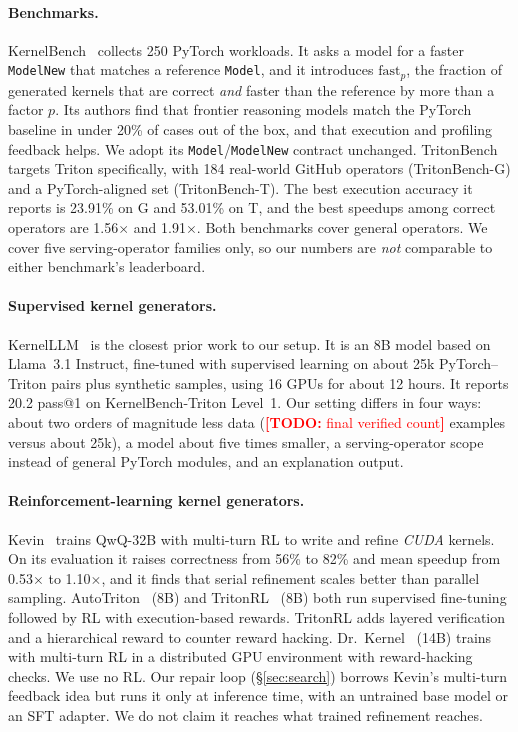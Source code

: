 \documentclass[11pt]{article}
\newcommand{\todo}[1]{\textcolor{red}{\textbf{[TODO:} #1\textbf{]}}}
\newcommand{\code}[1]{\texttt{#1}}
\begin{document}
\paragraph{Benchmarks.}
KernelBench~\cite{ouyang2025kernelbench} collects 250 PyTorch workloads. It asks a model for a
faster \code{ModelNew} that matches a reference \code{Model}, and it introduces $\mathrm{fast}_p$,
the fraction of generated kernels that are correct \emph{and} faster than the reference by more
than a factor $p$. Its authors find that frontier reasoning models match the PyTorch baseline in
under 20\% of cases out of the box, and that execution and profiling feedback helps. We adopt
its \code{Model}/\code{ModelNew} contract unchanged. TritonBench~\cite{li2025tritonbench} targets
Triton specifically, with 184 real-world GitHub operators (TritonBench-G) and a PyTorch-aligned
set (TritonBench-T). The best execution accuracy it reports is 23.91\% on G and 53.01\% on T, and
the best speedups among correct operators are 1.56$\times$ and 1.91$\times$. Both benchmarks cover
general operators. We cover five serving-operator families only, so our numbers are \emph{not}
comparable to either benchmark's leaderboard.

\paragraph{Supervised kernel generators.}
KernelLLM~\cite{fisches2025kernelllm} is the closest prior work to our setup. It is an 8B model
based on Llama~3.1 Instruct, fine-tuned with supervised learning on about 25k PyTorch--Triton
pairs plus synthetic samples, using 16 GPUs for about 12 hours. It reports 20.2 pass@1 on
KernelBench-Triton Level~1. Our setting differs in four ways: about two orders of magnitude
less data (\todo{final verified count} examples versus about 25k), a model about five times
smaller, a serving-operator scope instead of general PyTorch modules, and an explanation output.

\paragraph{Reinforcement-learning kernel generators.}
Kevin~\cite{baronio2025kevin} trains QwQ-32B with multi-turn RL to write and refine
\emph{CUDA} kernels. On its evaluation it raises correctness from 56\% to 82\% and mean speedup
from 0.53$\times$ to 1.10$\times$, and it finds that serial refinement scales better than
parallel sampling. AutoTriton~\cite{li2025autotriton} (8B) and TritonRL~\cite{woo2025tritonrl}
(8B) both run supervised fine-tuning followed by RL with execution-based rewards. TritonRL
adds layered verification and a hierarchical reward to counter reward hacking.
Dr.~Kernel~\cite{liu2026drkernel} (14B) trains with multi-turn RL in a distributed GPU environment
with reward-hacking checks. We use no RL. Our repair loop (\S\ref{sec:search}) borrows Kevin's
multi-turn feedback idea but runs it only at inference time, with an untrained base model or
an SFT adapter. We do not claim it reaches what trained refinement reaches.
\end{document}
